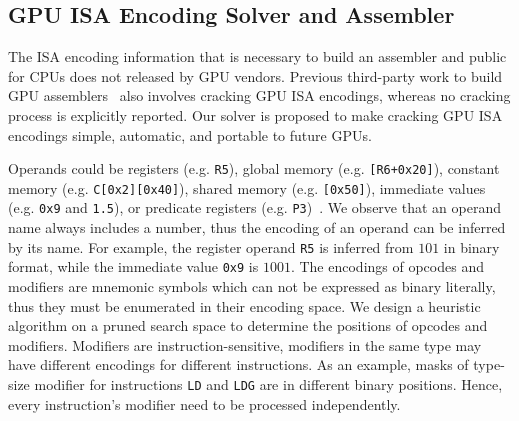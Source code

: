 \subsection{GPU ISA Encoding Solver and Assembler}

The ISA encoding information that is necessary to build an assembler and public for CPUs does not released by GPU vendors.
Previous third-party work to build GPU assemblers~\cite{decuda,asfermi,maxas} also
involves cracking GPU ISA encodings, whereas no cracking process is explicitly reported.
Our solver is proposed to make cracking GPU ISA encodings simple, automatic, and portable to future GPUs.

Operands could be registers (e.g. {\tt R5}),
global memory (e.g. {\tt [R6+0x20]}), constant memory (e.g. {\tt C[0x2][0x40]}), shared memory (e.g. {\tt [0x50]}), immediate values (e.g. {\tt 0x9} and {\tt1.5}), or predicate registers (e.g. {\tt P3})~\cite{ptx2015isa}.
We observe that an operand name always includes a number, thus the encoding of an operand can be inferred by its name.
For example, the register operand {\tt R5} is inferred from $101$ in binary format, while the immediate value {\tt 0x9} is $1001$. 
The encodings of opcodes and modifiers are mnemonic symbols which can not be expressed as binary literally, thus they must be enumerated in their encoding space.
We design a heuristic algorithm on a pruned search space to determine the positions of opcodes and modifiers.
Modifiers are instruction-sensitive, modifiers in the same type may have different encodings for different instructions. 
As an example, masks of type-size modifier for instructions {\tt LD} and {\tt LDG} are in different binary positions. 
Hence, every instruction's modifier need to be processed independently. 




